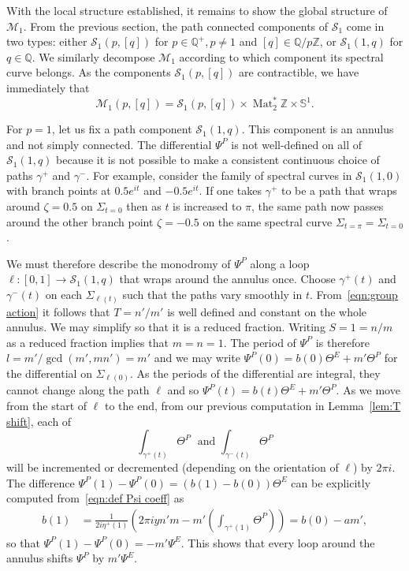 \documentclass{article}
\numberwithin{equation}{section}
\numberwithin{figure}{section}
\newcommand{\bra}[1]{\left(#1\right)}
\DeclareMathOperator{\Mat}{Mat}
\newcommand{\iu}{i}
\newcommand{\Z}{\mathbb{Z}}
\newcommand{\Q}{\mathbb{Q}}
\renewcommand{\S}{\mathbb{S}}
\begin{document}
With the local structure established, it remains to show the global structure of $\mathcal{M}_1$. From the previous section, the path connected components of $\mathcal{S}_1$ come in two types: either $\mathcal{S}_1(p,[q])$ for $p\in\Q^+, p\neq 1$ and $[q]\in\Q/p\Z$, or  $\mathcal{S}_1(1,q)$ for $q\in\Q$. We similarly decompose $\mathcal{M}_1$ according to which component its spectral curve belongs. As the components $\mathcal{S}_1(p,[q])$ are contractible, we have immediately that
\[
\mathcal{M}_1(p, [q]) = \mathcal{S}_1(p,[q]) \times \Mat_2^*\Z \times \S^1.
\]

For $p=1$, let us fix a path component $\mathcal{S}_1(1,q)$.
This component is an annulus and not simply connected. The differential $\Psi^P$ is not well-defined on all of $\mathcal{S}_1(1,q)$ because it is not possible to make a consistent continuous choice of paths $\gamma^+$ and $\gamma^-$. For example, consider the family of spectral curves in $\mathcal{S}_1(1,0)$ with branch points at $0.5 e^{\iu t}$ and $-0.5 e^{\iu t}$. If one takes $\gamma^+$ to be a path that wraps around $\zeta = 0.5$ on $\Sigma_{t=0}$ then as $t$ is increased to $\pi$, the same path now passes around the other branch point $\zeta=-0.5$ on the same spectral curve $\Sigma_{t=\pi} = \Sigma_{t=0}$. 

We must therefore describe the monodromy of $\Psi^P$ along a loop $\ell : [0,1] \to \mathcal{S}_1(1,q)$ that wraps around the annulus once. 
Choose $\gamma^+(t)$ and $\gamma^-(t)$ on each $\Sigma_{\ell(t)}$ such that the paths vary smoothly in $t$.
From~\eqref{eqn:group action} it follows that $T = n'/m'$ is well defined and constant on the whole annulus. We may simplify so that it is a reduced fraction. Writing $S=1=n/m$ as a reduced fraction implies that $m=n=1$. The period of $\Psi^P$ is therefore $l = m' / \gcd(m',mn') = m'$ and we may write $\Psi^P(0) = b(0)\Theta^E + m' \Theta^P$ for the differential on $\Sigma_{\ell(0)}$. As the periods of the differential are integral, they cannot change along the path $\ell$ and so $\Psi^P(t) = b(t) \Theta^E + m' \Theta^P$.
As we move from the start of $\ell$ to the end, from our previous computation in Lemma~\ref{lem:T shift}, each of
\[
\int_{\gamma^+(t)} \Theta^P \;\text{ and } \int_{\gamma^-(t)} \Theta^P
\]
will be incremented or decremented (depending on the orientation of $\ell$) by $2\pi\iu$. The difference $\Psi^P(1) - \Psi^P(0) = (b(1)-b(0))\Theta^E$ can be explicitly computed from~\eqref{eqn:def Psi coeff} as
\begin{align*}
b(1)
&= \frac{1}{2\iu \eta^+(1)}\bra{ 2\pi\iu y n'm - m' \bra{\int_{\gamma^+(1)} \Theta^P} }
= b(0) - am',
\end{align*}
so that $\Psi^P(1) - \Psi^P(0) = - m' \Psi^E$. This shows that every loop around the annulus shifts $\Psi^P$ by $m' \Psi^E$.
\end{document}
